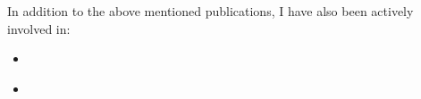 In addition to the above mentioned publications, I have also been actively involved in:
\begin{itemize}
\item \citet*{raghunathan19}
\item \citet*{raghunathan19_in}

\end{itemize}

                                                                                                                                    
\vspace{4.0cm}                                                                                                                                  
                                                                                                                                                
                                                                                                                                                

